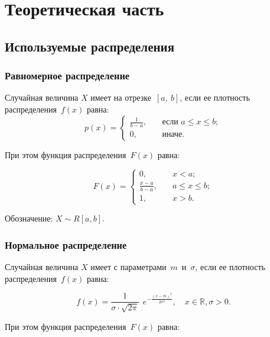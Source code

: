 \chapter{Теоретическая часть}

\section{Используемые распределения}

\subsection{Равномерное распределение}
Случайная величина $X$ имеет  на
отрезке~$[a,~b]$, если ее плотность распределения~$f(x)$ равна:
\begin{equation}
    p(x) =
    \begin{cases}
        \displaystyle\frac{1}{b - a}, & \quad \text{если } a \leq x \leq b;\\
        0,  & \quad \text{иначе}.
    \end{cases}
\end{equation}

При этом функция распределения~$F(x)$ равна:

\begin{equation}
    F(x) =
    \begin{cases}
        0,  & \quad x < a;\\
        \displaystyle\frac{x - a}{b - a}, & \quad a \leq x \leq b;\\
        1,  & \quad x > b.
    \end{cases}
\end{equation}

Обозначение: $X \sim R[a, b]$.

\subsection{Нормальное распределение}

Случайная величина $X$ имеет  с
параметрами~$m$~и~$\sigma$, если ее плотность распределения~$f(x)$ равна:

\begin{equation}
    f(x) = \frac{1}{\sigma \cdot \sqrt{2\pi}}~~e^{\displaystyle-\frac{(x -
    m)^2}{2\sigma^2}}, \quad x \in \mathbb{R}, \sigma > 0.
\end{equation}

При этом функция распределения~$F(x)$ равна:

